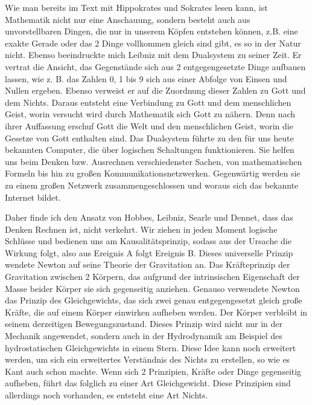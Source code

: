 \documentclass[DIN,
	fontsize=12pt,
a4paper]{scrartcl}
\begin{document}
Wie man bereits im Text mit Hippokrates und Sokrates lesen kann, ist Mathematik nicht nur eine Anschauung, sondern besteht auch aus unvorstellbaren Dingen, die nur in unserem Köpfen entstehen können, z.B. eine exakte Gerade oder das 2 Dinge vollkommen gleich sind gibt, es so in der Natur nicht.
Ebenso beeindruckte mich Leibniz mit dem Dualsystem zu seiner Zeit.
Er vertrat die Ansicht, das Gegenstände sich aus 2 entgegengesetzte Dinge aufbauen lassen, wie z. B. das Zahlen 0, 1 bis 9 sich aus einer Abfolge von Einsen und Nullen ergeben.
Ebenso verweist er auf die Zuordnung dieser Zahlen zu Gott und dem Nichts.
Daraus entsteht eine Verbindung zu Gott und dem menschlichen Geist, worin versucht wird durch Mathematik sich Gott zu nähern.
Denn nach ihrer Auffassung erschuf Gott die Welt und den menschlichen Geist, worin die Gesetze von Gott enthalten sind.
Das Dualsystem führte zu den für uns heute bekannten Computer, die über logischen Schaltungen funktionieren. Sie helfen uns beim Denken bzw. Ausrechnen verschiedenster Sachen, von mathematischen Formeln bis hin zu großen Kommunikationsnetzwerken.
Gegenwärtig werden sie zu einem großen Netzwerk zusammengeschlossen und woraus sich das bekannte Internet bildet.

Daher finde ich den Ansatz von Hobbes, Leibniz, Searle und Dennet, dass das Denken Rechnen ist, nicht verkehrt.
Wir ziehen in jeden Moment logische Schlüsse und bedienen uns am Kausalitätsprinzip, sodass aus der Ursache die Wirkung folgt, also aus Ereignis A folgt Ereignis B.
Dieses universelle Prinzip wendete Newton auf seine Theorie der Gravitation an.
Das Kräfteprinzip der Gravitation zwischen 2 Körpern, das aufgrund der intrinsischen Eigenschaft der Masse beider Körper sie sich gegenseitig anziehen.
Genauso verwendete Newton das Prinzip des Gleichgewichts, das sich zwei genau entgegengesetzt gleich große Kräfte, die auf einem Körper einwirken aufheben werden.
Der Körper verbleibt in seinem derzeitigen Bewegungszustand.
Dieses Prinzip wird nicht nur in der Mechanik angewendet, sondern auch in der Hydrodynamik am Beispiel des hydrostatischen Gleichgewichts in einem Stern.
Diese Idee kann noch erweitert werden, um sich ein erweitertes Verständnis des Nichts zu erstellen, so wie es Kant auch schon machte.
Wenn sich 2 Prinzipien, Kräfte oder Dinge gegenseitig aufheben, führt das folglich zu einer Art Gleichgewicht.
Diese Prinzipien sind allerdings noch vorhanden, es entsteht eine Art Nichts.
\end{document}

